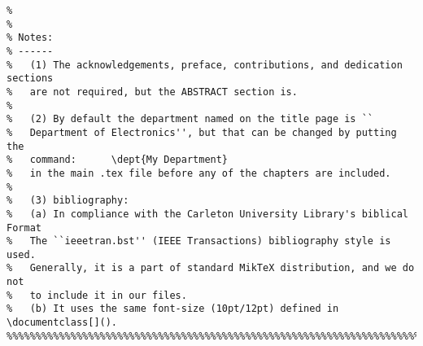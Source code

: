 \documentclass{article}
\begin{document}
\begin{verbatim}
%
%   
% Notes: 
% ------ 
%   (1) The acknowledgements, preface, contributions, and dedication sections 
%   are not required, but the ABSTRACT section is.
%   
%   (2) By default the department named on the title page is ``
%   Department of Electronics'', but that can be changed by putting the
%   command:      \dept{My Department}
%   in the main .tex file before any of the chapters are included.
%
%   (3) bibliography:
%   (a) In compliance with the Carleton University Library's biblical Format
%   The ``ieeetran.bst'' (IEEE Transactions) bibliography style is used.
%   Generally, it is a part of standard MikTeX distribution, and we do not 
%   to include it in our files.
%   (b) It uses the same font-size (10pt/12pt) defined in \documentclass[]().
%%%%%%%%%%%%%%%%%%%%%%%%%%%%%%%%%%%%%%%%%%%%%%%%%%%%%%%%%%%%%%%%%%%%%%%%%%%%%%%%
\end{verbatim}
\end{document}
